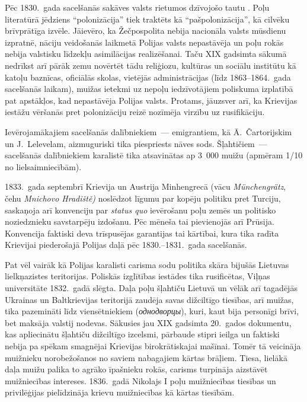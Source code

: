 \documentclass[twoside,a5paper,12pt,fleqn,openany]{extbook}
\newcommand{\rutxti}[1]{\textit{\textrussian{#1}}}
\newcommand{\detxti}[1]{\textit{\textgerman{#1}}}
\newcommand{\latxti}[1]{\textit{\textlatin{#1}}}
\newcommand{\cstxti}[1]{\textit{\textczech{#1}}}
\begin{document}
Pēc 1830.~gada sacelšanās sakāves  valsts rietumos dzīvojošo tautu . Poļu literatūrā jēdziens ``polonizācija'' tiek traktēts kā ``pašpolonizācija'', kā cilvēku brīvprātīga izvēle. Jāievēro, ka Žečpospolita nebija nacionāla valsts mūsdienu izpratnē, nāciju veidošanās laikmetā Polijas valsts nepastāvēja un poļu rokās nebija valstisku līdzekļu asimilācijas realizēšanai. Taču XIX gadsimta sākumā nedrīkst arī pārāk zemu novērtēt tādu reliģiozu, kultūras un sociālu institūtu kā katoļu baznīcas, oficiālās skolas, vietējās administrācijas (līdz 1863--1864.~gada sacelšanās laikam), muižas ietekmi uz nepoļu iedzīvotājiem poliskuma izplatībā pat apstākļos, kad nepastāvēja Polijas valsts. Protams, jāuzsver arī, ka Krievijas iestāžu vēršanās pret polonizāciju reizē nozīmēja virzību uz rusifikāciju.

Ievērojamākajiem sacelšanās dalībniekiem~--- emigrantiem, kā Ā.~Čartorijskim un J.~Lelevelam, aizmuguriski tika piespriests nāves sods. Šļahtičiem~--- sacelšanās dalībniekiem karalistē tika atsavinātas ap 3~000 muižu (apmēram 1/10 no lielsaimniecībām).

1833.~gada septembrī Krievija un Austrija Minhengrecā (vācu \detxti{Münchengrätz}, čehu \cstxti{Mnichovo Hradiště)} noslēdzot līgumu par kopēju politiku pret Turciju, saskaņoja arī konvenciju par \latxti{status quo} ievērošanu poļu zemēs un politisko noziedznieku savstarpēju izdošanu. Pēc mēneša tai pievienojās arī Prūsija. Konvencija faktiski deva trīspusējas garantijas tai kārtībai, kura tika radīta Krievijai piederošajā Polijas daļā pēc 1830.--1831.~gada sacelšanās.

Pat vēl vairāk kā Polijas karalisti carisma sodu politika skāra bijušās Lietuvas lielkņazistes teritorijas. Poliskās izglītības iestādes tika rusificētas, Viļņas universitāte 1832.~gadā slēgta. Daļa poļu šļahtiču Lietuvā un vēlāk arī tagadējās Ukrainas un Baltkrievijas teritorijā zaudēja savas dižciltīgo tiesības, arī muižas, tika pazemināti līdz viensētniekiem (\rutxti{однодворцы}), kuri, kaut bija personīgi brīvi, bet maksāja valstij nodevas. Sākusies jau XIX gadsimta 20.~gados dokumentu, kas apliecinātu šļahtiču dižciltīgo izcelsmi, pārbaude stipri ieilga un faktiski nebija pa spēkam smagnējai Krievijas birokrātiskajai mašīnai. Tomēr tā veicināja muižnieku norobežošanos no saviem nabagajiem kārtas brāļiem. Tiesa, lielākā daļa muižu palika to agrāko īpašnieku rokās, carisms turpināja aizstāvēt muižniecības intereses. 1836.~gadā Nikolajs I poļu muižniecības tiesības un privilēģijas pielīdzināja krievu muižniecības kā kārtas tiesībām.
\end{document}
